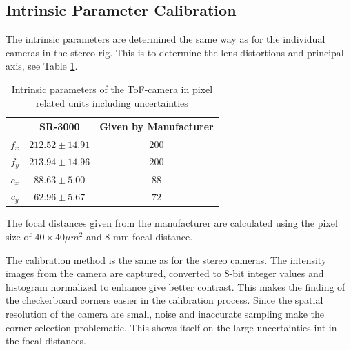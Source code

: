 \subsection{Intrinsic Parameter Calibration}
The intrinsic parameters are determined the same way as for the individual cameras in the
stereo rig. This is to determine the lens distortions and principal axis, see Table
\ref{chap3:tab-intrinsic-sr3000}.
\begin{table}[htbp]
  \centering
    \begin{tabular}{|c|c|c|} 
        \hline
                & SR-3000       & Given by Manufacturer \\
        \hline
        $f_x$   & $212.52 \pm 14.91 $  & $200$  \\
        $f_y$   & $213.94 \pm 14.96 $  & $200$  \\
        \hline
        $c_x$   & $88.63 \pm 5.00$  & $88$ \\
        $c_y$   & $ 62.96 \pm 5.67 $ & $72$  \\
        \hline
    \end{tabular}
    \caption{Intrinsic parameters of the ToF-camera in pixel related units including
    uncertainties}
    \label{chap3:tab-intrinsic-sr3000}
\end{table}
The focal distances given from the manufacturer are calculated using the pixel size of
$40 \times 40 \mu m^2$ and 8 mm focal distance.

The calibration method is the same as for the stereo cameras. The intensity images from
the camera are captured, converted to 8-bit integer values and histogram normalized to
enhance give better contrast. This makes the finding of the checkerboard corners easier in
the calibration process. Since the spatial resolution of the camera are small, noise and
inaccurate sampling make the corner selection problematic. This shows itself on the large
uncertainties int in the focal distances. 

